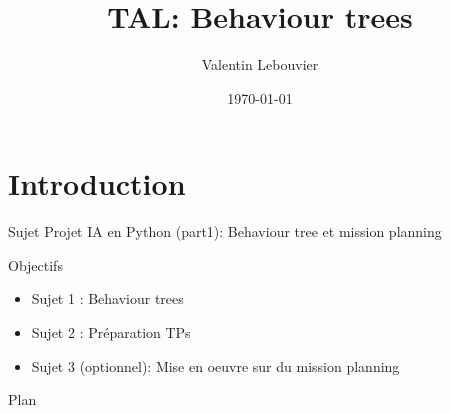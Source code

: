 \documentclass[presentation]{beamer}
\author{Valentin Lebouvier}
\date{\today}
\title{TAL: Behaviour trees}
\begin{document}
\maketitle


\section{Introduction}
\label{sec-1}
\begin{frame}[label=sec-1-0-1]{Sujet}
\alert{Projet IA en Python (part1): Behaviour tree et mission planning}
\end{frame}

\begin{frame}[label=sec-1-0-2]{Objectifs}
\begin{itemize}
\item Sujet 1 : Behaviour trees
\item Sujet 2 : Préparation TPs
\item Sujet 3 (optionnel): Mise en oeuvre sur du mission planning
\end{itemize}
\end{frame}

\begin{frame}[label=sec-1-0-3]{Plan}
\tableofcontents
\end{frame}
\end{document}

